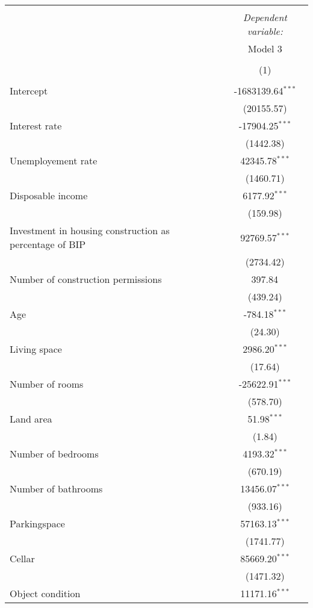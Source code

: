 \begin{table}[!htbp] \centering
\begin{tabular}{@{\extracolsep{5pt}}lc}
\\[-1.8ex]\hline
\hline \\[-1.8ex]
& \multicolumn{1}{c}{\textit{Dependent variable:}} \
\cr \cline{1-2}
\\[-1.8ex] & \multicolumn{1}{c}{Model 3} \\\\[-1.8ex] & (1) \\
\hline \\[-1.8ex]
 Intercept & -1683139.64$^{***}$ \\
  & (20155.57) \\
 Interest rate & -17904.25$^{***}$ \\
  & (1442.38) \\
 Unemployement rate & 42345.78$^{***}$ \\
  & (1460.71) \\
 Disposable income & 6177.92$^{***}$ \\
  & (159.98) \\
 Investment in housing construction as percentage of BIP & 92769.57$^{***}$ \\
  & (2734.42) \\
 Number of construction permissions & 397.84$^{}$ \\
  & (439.24) \\
 Age & -784.18$^{***}$ \\
  & (24.30) \\
 Living space & 2986.20$^{***}$ \\
  & (17.64) \\
 Number of rooms & -25622.91$^{***}$ \\
  & (578.70) \\
 Land area & 51.98$^{***}$ \\
  & (1.84) \\
 Number of bedrooms & 4193.32$^{***}$ \\
  & (670.19) \\
 Number of bathrooms & 13456.07$^{***}$ \\
  & (933.16) \\
 Parkingspace & 57163.13$^{***}$ \\
  & (1741.77) \\
 Cellar & 85669.20$^{***}$ \\
  & (1471.32) \\
 Object condition & 11171.16$^{***}$ \\

\end{tabular}
\end{table}
